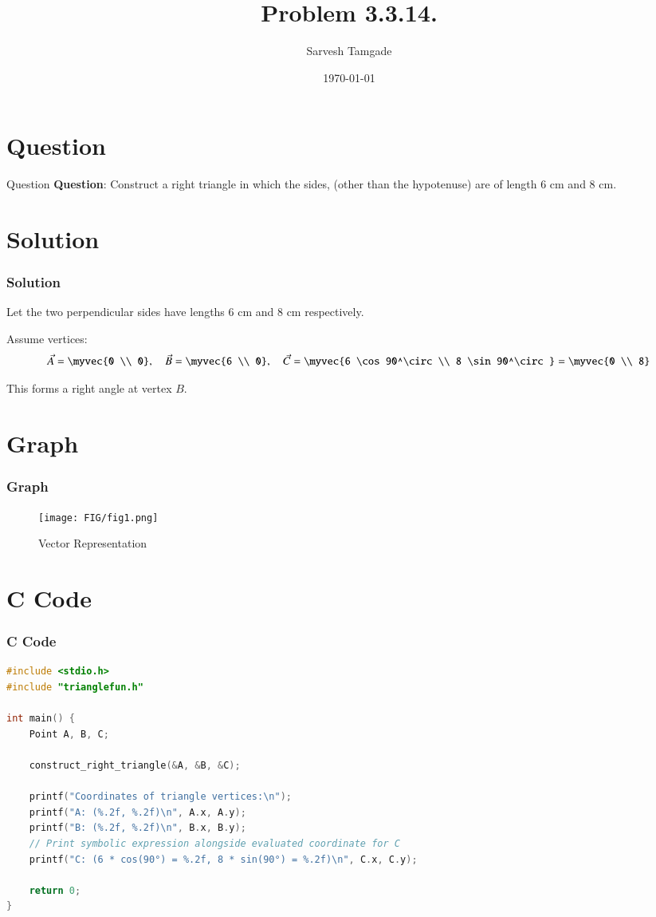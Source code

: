 \documentclass{beamer}
\title{Problem 3.3.14.}
\author{Sarvesh Tamgade}
\date{\today}
\numberwithin{equation}{section}
\begin{document}
\begin{frame}
\titlepage
\end{frame}

\section{Question}
\begin{frame}{Question}
\textbf{Question}:
 Construct a right triangle in which the sides, (other than the hypotenuse) are of length 6 cm and 8 cm.
\end{frame}

\section{Solution}
\begin{frame}[fragile]
    \frametitle{Solution}
Let the two perpendicular sides have lengths 6 cm and 8 cm respectively.

Assume vertices:
\[
\vec{A} = \myvec{0 \\ 0}, \quad
\vec{B} = \myvec{6 \\ 0}, \quad
\vec{C} = \myvec{6 \cos 90^\circ \\ 8 \sin 90^\circ} = \myvec{0 \\ 8}
\]



This forms a right angle at vertex \(B\).



\end{frame}
\section{Graph}
\begin{frame}
    \frametitle{Graph}
    \begin{figure}[htbp]
    \centering
    \texttt{[image: FIG/fig1.png]}
    \caption{Vector Representation}
    \label{fig:FIG/fig1.png}
\end{figure}
\end{frame}
\section{ C Code}
\begin{frame}[fragile]
\frametitle{C Code }
\begin{lstlisting}[language=C]
#include <stdio.h>
#include "trianglefun.h"

int main() {
    Point A, B, C;

    construct_right_triangle(&A, &B, &C);

    printf("Coordinates of triangle vertices:\n");
    printf("A: (%.2f, %.2f)\n", A.x, A.y);
    printf("B: (%.2f, %.2f)\n", B.x, B.y);
    // Print symbolic expression alongside evaluated coordinate for C
    printf("C: (6 * cos(90°) = %.2f, 8 * sin(90°) = %.2f)\n", C.x, C.y);

    return 0;
}


    
\end{lstlisting}
\end{frame}
\end{document}
